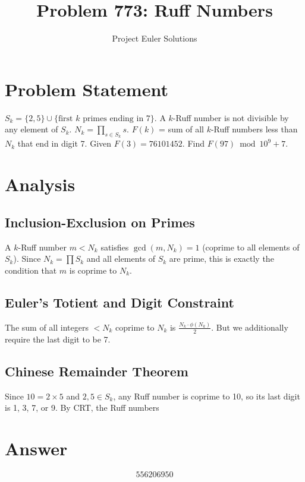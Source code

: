 \documentclass[11pt]{article}
\title{Problem 773: Ruff Numbers}
\author{Project Euler Solutions}
\date{}
\begin{document}
\maketitle
\section{Problem Statement}
$S_k = \{2, 5\} \cup \{\text{first } k \text{ primes ending in 7}\}$. A $k$-Ruff number is not divisible by any element of $S_k$. $N_k = \prod_{s \in S_k} s$. $F(k)$ = sum of all $k$-Ruff numbers less than $N_k$ that end in digit 7. Given $F(3) = 76101452$. Find $F(97) \bmod 10^9+7$.
\section{Analysis}
\subsection*{Inclusion-Exclusion on Primes}

A $k$-Ruff number $m < N_k$ satisfies $\gcd(m, N_k) = 1$ (coprime to all elements of $S_k$). Since $N_k = \prod S_k$ and all elements of $S_k$ are prime, this is exactly the condition that $m$ is coprime to $N_k$.

\subsection*{Euler's Totient and Digit Constraint}

The sum of all integers $< N_k$ coprime to $N_k$ is $\frac{N_k \cdot \phi(N_k)}{2}$. But we additionally require the last digit to be 7.

\subsection*{Chinese Remainder Theorem}

Since $10 = 2 \times 5$ and $2, 5 \in S_k$, any Ruff number is coprime to 10, so its last digit is 1, 3, 7, or 9. By CRT, the Ruff numbers 
\section{Answer}

\[
\boxed{556206950}
\]
\end{document}
